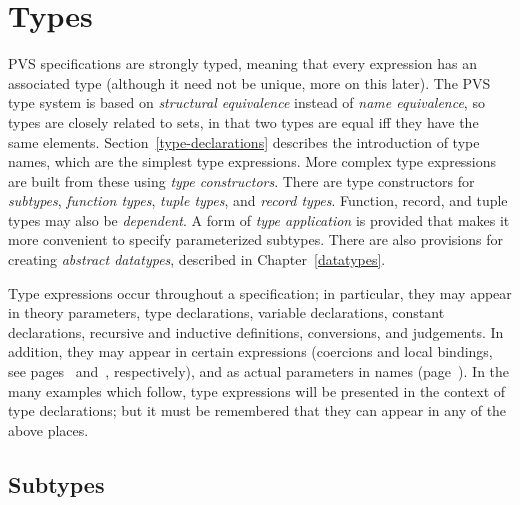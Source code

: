 
\chapter{Types}\label{types}

PVS specifications are strongly typed, meaning that every expression has
an associated type (although it need not be unique, more on this later).
The PVS type system is based on \emph{structural
equivalence} instead of \emph{name
equivalence}, so types are closely related to
sets, in that two types are equal iff they have the same elements.
Section~\ref{type-declarations} describes the introduction of type names,
which are the simplest type expressions.  More complex type
expressions are built from these using \emph{type
constructors}.  There are type constructors for
\emph{subtypes}, \emph{function
types}, \emph{tuple
types}, and \emph{record
types}.  Function, record,
and tuple types may also be \emph{dependent}.  A form of \emph{type
application} is
provided that makes it more convenient to specify parameterized subtypes.
There are also provisions for creating \emph{abstract datatypes},
described in Chapter~\ref{datatypes}.

Type expressions occur throughout a specification; in particular, they may
appear in theory parameters, type declarations, variable declarations,
constant declarations, recursive and inductive definitions, conversions,
and judgements.  In
addition, they may appear in certain expressions (coercions and local
bindings, see pages~\pageref{coercions} and~\pageref{binding-expressions},
respectively), and as actual parameters in names (page~\pageref{names}).
In the many examples which follow, type expressions will be presented in
the context of type declarations; but it must be remembered that they can
appear in any of the above places.


\section{Subtypes}\label{subtypes}


